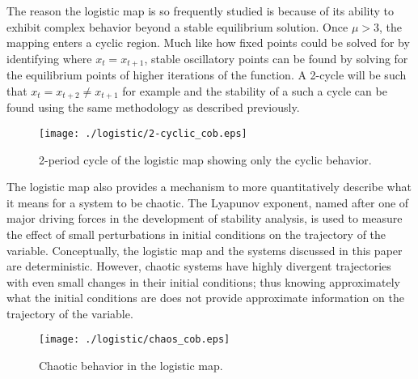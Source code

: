 The reason the logistic map is so frequently studied is because of its ability to exhibit complex behavior beyond a stable equilibrium solution. Once $\mu>3$, the mapping enters a cyclic region. Much like how fixed points could be solved for by identifying where $x_{t}=x_{t+1}$, stable oscillatory points can be found by solving for the equilibrium points of higher iterations of the function. A 2-cycle will be such that $x_{t}=x_{t+2}\neq x_{t+1}$ for example and the stability of a such a cycle can be found using the same methodology as described previously. 
\begin{figure}
    \centering
    \texttt{[image: ./logistic/2-cyclic\_cob.eps]}
    \caption{2-period cycle of the logistic map showing only the cyclic behavior.}
    \label{log_cyclic_cob}
\end{figure}
The logistic map also provides a mechanism to more quantitatively describe what it means for a system to be chaotic. The Lyapunov exponent, named after one of major driving forces in the development of stability analysis, is used to measure the effect of small perturbations in initial conditions on the trajectory of the variable\autocite{Puu2003}. Conceptually, the logistic map and the systems discussed in this paper are deterministic. However, chaotic systems have highly divergent trajectories with even small changes in their initial conditions; thus knowing approximately what the initial conditions are does not provide approximate information on the trajectory of the variable. 
\begin{figure}
    \centering
    \texttt{[image: ./logistic/chaos\_cob.eps]}
    \caption{Chaotic behavior in the logistic map.}
    \label{log_chaos_cob}
\end{figure}

